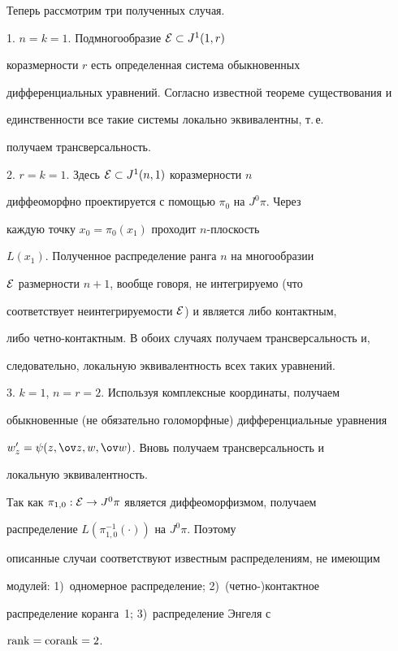 Теперь рассмотрим три полученных случая.





1. $n=k=1$. Подмногообразие ${\cal E}\subset J^1(1,r)$


коразмерности $r$ есть определенная система обыкновенных


дифференциальных уравнений. Согласно известной теореме существования и


единственности все такие системы локально эквивалентны, т.\,е.


получаем трансверсальность.





2. $r=k=1$. Здесь ${\cal E}\subset J^1(n,1)$ коразмерности $n$


диффеоморфно проектируется с помощью $\pi_0$ на $J^0\pi$. Через


каждую точку $x_0=\pi_0(x_1)$ проходит $n$-плоскость


$L(x_1)$. Полученное распределение ранга $n$ на многообразии


${\cal E}$ размерности $n+1$, вообще говоря, не интегрируемо (что


соответствует неинтегрируемости ${\cal E}$) и является либо контактным,


либо четно-контактным. В обоих случаях получаем трансверсальность и,


следовательно, локальную эквивалентность всех таких уравнений.





3. $k=1$, $n=r=2$. Используя комплексные координаты, получаем


обыкновенные (не обязательно голоморфные) дифференциальные уравнения


$w'_z=\psi(z,\ov z,w,\ov w)$. Вновь получаем трансверсальность и


локальную эквивалентность.





\begin{note}\label{rkrk}


Так как $\pi_{1,0}:{\cal E}\to J^0\pi$ является диффеоморфизмом, получаем


распределение $L(\pi_{1,0}^{-1}(\cdot))$ на $J^0\pi$. Поэтому


описанные случаи соответствуют известным распределениям, не имеющим


модулей: 1)~одномерное распределение; 2)~(четно-)контактное


распределение коранга~1; 3)~распределение Энгеля с


$\operatorname{rank}=\mathop{\mathrm{corank}}\nolimits=2$.


\end{note}





